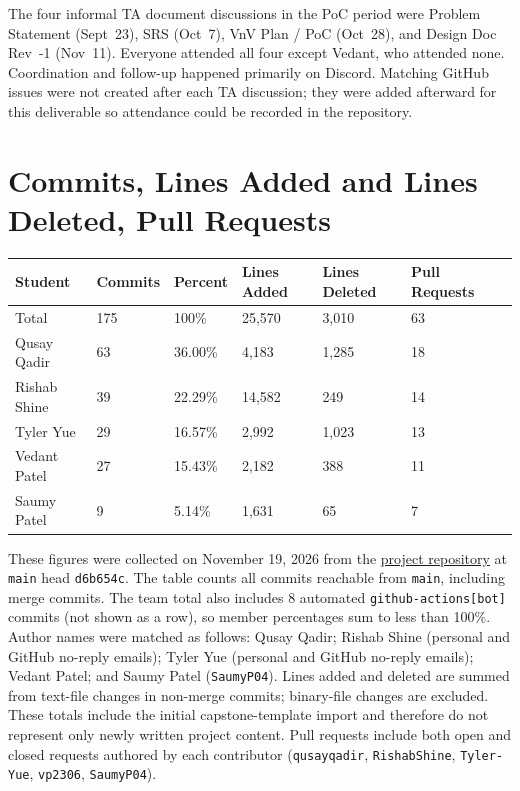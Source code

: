 \documentclass{article}
\begin{document}
The four informal TA document discussions in the PoC period were Problem
Statement (Sept~23), SRS (Oct~7), VnV Plan / PoC (Oct~28), and Design Doc
Rev~-1 (Nov~11). Everyone attended all four except Vedant, who attended none.
Coordination and follow-up happened primarily on Discord. Matching GitHub
issues were not created after each TA discussion; they were added afterward for
this deliverable so attendance could be recorded in the repository.

\section{Commits, Lines Added and Lines Deleted, Pull Requests}

\begin{table}[H]
\centering
\begin{tabular}{lllllll}
\toprule
\textbf{Student} & \textbf{Commits} & \textbf{Percent} & \textbf{Lines Added} &
\textbf{Lines Deleted} & \textbf{Pull Requests}\\
\midrule
Total & 175 & 100\% & 25,570 & 3,010 & 63\\
Qusay Qadir & 63 & 36.00\% & 4,183 & 1,285 & 18\\
Rishab Shine & 39 & 22.29\% & 14,582 & 249 & 14\\
Tyler Yue & 29 & 16.57\% & 2,992 & 1,023 & 13\\
Vedant Patel & 27 & 15.43\% & 2,182 & 388 & 11\\
Saumy Patel & 9 & 5.14\% & 1,631 & 65 & 7\\
\bottomrule
\end{tabular}
\end{table}

These figures were collected on November 19, 2026 from the
\href{https://github.com/RishabShine/IDE3.0}{project repository} at
\texttt{main} head \texttt{d6b654c}. The table counts all commits reachable from
\texttt{main}, including merge commits. The team total also includes 8
automated \texttt{github-actions[bot]} commits (not shown as a row), so member
percentages sum to less than 100\%. Author names were matched as follows:
Qusay Qadir; Rishab Shine (personal and GitHub no-reply emails); Tyler Yue
(personal and GitHub no-reply emails); Vedant Patel; and Saumy Patel
(\texttt{SaumyP04}). Lines added and deleted are summed from text-file changes
in non-merge commits; binary-file changes are excluded. These totals include
the initial capstone-template import and therefore do not represent only newly
written project content. Pull requests include both open and closed requests
authored by each contributor (\texttt{qusayqadir}, \texttt{RishabShine},
\texttt{Tyler-Yue}, \texttt{vp2306}, \texttt{SaumyP04}).
\end{document}
